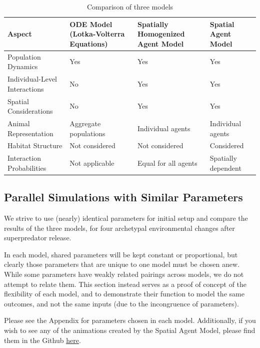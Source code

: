 \documentclass[journal]{IEEEtran}
\begin{document}
\vspace{-3mm}
\begin{table}[b]
\begin{tabular}{|p{1.5cm}|p{1.5cm}|p{1.5cm}|p{1.5cm}|}
\hline
\textbf{Aspect}               & \textbf{ODE Model (Lotka-Volterra Equations)} & \textbf{Spatially Homogenized Agent Model} & \textbf{Spatial Agent Model} \\ \hline
Population Dynamics           & Yes                                           & Yes                                        & Yes                          \\ \hline
Individual-Level Interactions & No                                            & Yes                                        & Yes                          \\ \hline
Spatial Considerations        & No                                            & Yes                                        & Yes                          \\ \hline
Animal Representation         & Aggregate populations                         & Individual agents                          & Individual agents            \\ \hline
Habitat Structure             & Not considered                                & Not considered                             & Considered                   \\ \hline
Interaction Probabilities     & Not applicable                                & Equal for all agents                       & Spatially dependent          \\ \hline
\end{tabular}
\vspace{0.1mm}
\caption{Comparison of three models}
\label{tab:comparison}
\end{table}

\newpage

\subsection{Parallel Simulations with Similar Parameters}
We strive to use (nearly) identical parameters for initial setup and compare the results of the three models, for four archetypal environmental changes after superpredator release.\par
In each model, shared parameters will be kept constant or proportional, but clearly those parameters that are unique to one model must be chosen anew. While some parameters have weakly related pairings across models, we do not attempt to relate them. This section instead serves as a proof of concept of the flexibility of each model, and to demonstrate their function to model the same outcomes, and not the same inputs (due to the incongruence of parameters).\par
Please see the Appendix for parameters chosen in each model. Additionally, if you wish to see any of the animations created by the Spatial Agent Model, please find them in the Github \href{https://github.com/UChi-ComPy23/group-project-group_11/tree/main/examples}{here}.
\end{document}
